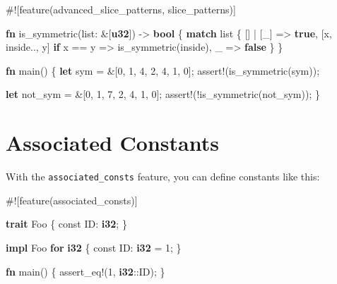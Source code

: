 \documentclass[a4paper,]{book}
\newenvironment{Shaded}{\begin{snugshade}}{\end{snugshade}}
\newcommand{\KeywordTok}[1]{\textcolor[rgb]{0.13,0.29,0.53}{\textbf{{#1}}}}
\newcommand{\DecValTok}[1]{\textcolor[rgb]{0.00,0.00,0.81}{{#1}}}
\newcommand{\OtherTok}[1]{\textcolor[rgb]{0.56,0.35,0.01}{{#1}}}
\newcommand{\NormalTok}[1]{{#1}}
\begin{document}
\begin{Shaded}
\begin{Highlighting}[]
\NormalTok{#![feature(advanced_slice_patterns, slice_patterns)]}

\KeywordTok{fn} \NormalTok{is_symmetric(list: &[}\KeywordTok{u32}\NormalTok{]) -> }\KeywordTok{bool} \NormalTok{\{}
    \KeywordTok{match} \NormalTok{list \{}
        \NormalTok{[] | [_] => }\KeywordTok{true}\NormalTok{,}
        \NormalTok{[x, inside.., y] }\KeywordTok{if} \NormalTok{x == y => is_symmetric(inside),}
        \NormalTok{_ => }\KeywordTok{false}
    \NormalTok{\}}
\NormalTok{\}}

\KeywordTok{fn} \NormalTok{main() \{}
    \KeywordTok{let} \NormalTok{sym = &[}\DecValTok{0}\NormalTok{, }\DecValTok{1}\NormalTok{, }\DecValTok{4}\NormalTok{, }\DecValTok{2}\NormalTok{, }\DecValTok{4}\NormalTok{, }\DecValTok{1}\NormalTok{, }\DecValTok{0}\NormalTok{];}
    \OtherTok{assert!}\NormalTok{(is_symmetric(sym));}

    \KeywordTok{let} \NormalTok{not_sym = &[}\DecValTok{0}\NormalTok{, }\DecValTok{1}\NormalTok{, }\DecValTok{7}\NormalTok{, }\DecValTok{2}\NormalTok{, }\DecValTok{4}\NormalTok{, }\DecValTok{1}\NormalTok{, }\DecValTok{0}\NormalTok{];}
    \OtherTok{assert!}\NormalTok{(!is_symmetric(not_sym));}
\NormalTok{\}}
\end{Highlighting}
\end{Shaded}

\section{Associated Constants}\label{sec--associated-constants}

With the \texttt{associated\_consts} feature, you can define constants
like this:

\begin{Shaded}
\begin{Highlighting}[]
\NormalTok{#![feature(associated_consts)]}

\KeywordTok{trait} \NormalTok{Foo \{}
    \NormalTok{const ID: }\KeywordTok{i32}\NormalTok{;}
\NormalTok{\}}

\KeywordTok{impl} \NormalTok{Foo }\KeywordTok{for} \KeywordTok{i32} \NormalTok{\{}
    \NormalTok{const ID: }\KeywordTok{i32} \NormalTok{= }\DecValTok{1}\NormalTok{;}
\NormalTok{\}}

\KeywordTok{fn} \NormalTok{main() \{}
    \OtherTok{assert_eq!}\NormalTok{(}\DecValTok{1}\NormalTok{, }\KeywordTok{i32}\NormalTok{::ID);}
\NormalTok{\}}
\end{Highlighting}
\end{Shaded}
\end{document}
